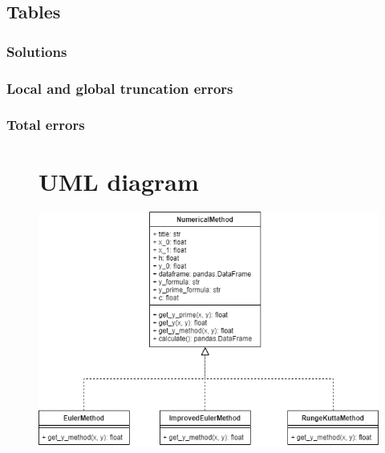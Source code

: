 \documentclass[12pt,letterpaper]{article}
\begin{document}
\clearpage


\begin{center}
\subsection*{Tables}
\subsubsection*{Solutions}
\end{center}


\begin{center}
\subsubsection*{Local and global truncation errors}

\end{center}

\begin{center}
\subsubsection*{Total errors}

\end{center}

\begin{figure}[!h]
    \begin{center}
        \section*{UML diagram}
    \end{center}
    \centering
        \includegraphics[width=1\linewidth]{uml.png}
\end{figure}
\end{document}
